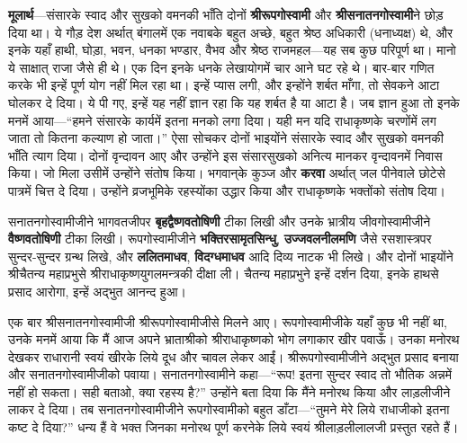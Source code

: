 \begin{sloppypar}\justifying{}
\textbf{मूलार्थ}—संसारके स्वाद और सुखको वमनकी भाँति दोनों \textbf{श्रीरूप\-गोस्वामी} और \textbf{श्रीसनातन\-गोस्वामी}ने छोड़ दिया था। ये गौड़ देश अर्थात् बंगालमें एक नवाबके बहुत अच्छे, बहुत श्रेष्ठ अधिकारी (धनाध्यक्ष) थे, और इनके यहाँ हाथी, घोड़ा, भवन, धनका भण्डार, वैभव और श्रेष्ठ राजमहल—यह सब कुछ परिपूर्ण था। मानो ये साक्षात् राजा जैसे ही थे। एक दिन इनके धनके लेखा\-योगमें चार आने घट रहे थे। बार-बार गणित करके भी इन्हें पूर्ण योग नहीं मिल रहा था। इन्हें प्यास लगी, और इन्होंने शर्बत माँगा, तो सेवकने आटा घोलकर दे दिया। ये पी गए, इन्हें यह नहीं ज्ञान रहा कि यह शर्बत है या आटा है। जब ज्ञान हुआ तो इनके मनमें आया—“हमने संसारके कार्यमें इतना मनको लगा दिया। यही मन यदि राधा\-कृष्णके चरणोंमें लग जाता तो कितना कल्याण हो जाता।” ऐसा सोचकर दोनों भाइयोंने संसारके स्वाद और सुखको वमनकी भाँति त्याग दिया। दोनों वृन्दावन आए और उन्होंने इस संसार\-सुखको अनित्य मानकर वृन्दावनमें निवास किया। जो मिला उसीमें उन्होंने संतोष किया। भगवान्‌के कुञ्ज और \textbf{करवा} अर्थात् जल पीनेवाले छोटेसे पात्रमें चित्त दे दिया। उन्होंने व्रजभूमिके रहस्योंका उद्धार किया और राधा\-कृष्णके भक्तोंको संतोष दिया।
\end{sloppypar}
\begin{sloppypar}\justifying{}
सनातन\-गोस्वामीजीने भागवतजीपर \textbf{बृहद्वैष्णव\-तोषिणी} टीका लिखी और उनके भ्रात्रीय जीव\-गोस्वामीजीने \textbf{वैष्णवतोषिणी} टीका लिखी। रूप\-गोस्वामीजीने \textbf{भक्ति\-रसामृत\-सिन्धु}, \textbf{उज्जवल\-नील\-मणि} जैसे रस\-शास्त्रपर सुन्दर-सुन्दर ग्रन्थ लिखे, और \textbf{ललित\-माधव}, \textbf{विदग्ध\-माधव} आदि दिव्य नाटक भी लिखे। और दोनों भाइयोंने श्रीचैतन्य महाप्रभुसे श्रीराधा\-कृष्ण\-युगलमन्त्रकी दीक्षा ली। चैतन्य महाप्रभुने इन्हें दर्शन दिया, इनके हाथसे प्रसाद आरोगा, इन्हें अद्भुत आनन्द हुआ।
\end{sloppypar}
\begin{sloppypar}\justifying{}
एक बार श्रीसनातन\-गोस्वामीजी श्रीरूप\-गोस्वामीजीसे मिलने आए। रूप\-गोस्वामीजीके यहाँ कुछ भी नहीं था, उनके मनमें आया कि मैं आज अपने भ्राताश्रीको श्रीराधा\-कृष्णको भोग लगाकार खीर पवाऊँ। उनका मनोरथ देखकर राधा\-रानी स्वयं खीरके लिये दूध और चावल लेकर आईं। श्रीरूप\-गोस्वामीजीने अद्भुत प्रसाद बनाया और सनातन\-गोस्वामीजीको पवाया। सनातन\-गोस्वामीने कहा—“रूप! इतना सुन्दर स्वाद तो भौतिक अन्नमें नहीं हो सकता। सही बताओ, क्या रहस्य है?” उन्होंने बता दिया कि मैंने मनोरथ किया और लाड़लीजीने लाकर दे दिया। तब सनातन\-गोस्वामीजीने रूप\-गोस्वामीको बहुत डाँटा—“तुमने मेरे लिये राधाजीको इतना कष्ट दे दिया?” धन्य हैं वे भक्त जिनका मनोरथ पूर्ण करनेके लिये स्वयं श्रीलाड़ली\-लालजी प्रस्तुत रहते हैं।
\end{sloppypar}

